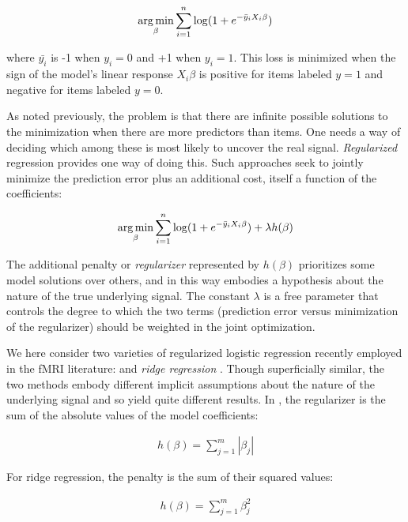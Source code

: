 \begin{align}
\operatorname*{arg\,min}_\beta \sum^{n}_{i=1}{\log(1 + e^{-\bar{y}_i X_i\beta})}
\label{eq.logisticopt}
\end{align}

\noindent where $\bar{y_i}$ is -1 when $y_i=0$ and +1 when $y_i=1$. This loss is minimized when the sign of the model's linear response $X_i\beta$ is positive for items labeled $y=1$ and negative for items labeled $y=0$.

As noted previously, the problem is that there are infinite possible solutions to the minimization when there are more predictors than items. One needs a way of deciding which among these is most likely to uncover the real signal. {\em Regularized} regression provides one way of doing this. Such approaches seek to jointly minimize the prediction error plus an additional cost, itself a function of the coefficients:

\begin{align}
\operatorname*{arg\,min}_\beta \sum^{n}_{i=1}{\log(1 + e^{-\bar{y}_i X_i\beta})} + \lambda h(\beta)
\label{eq.regularized}
\end{align}

The additional penalty or {\em regularizer} represented by $h(\beta)$ prioritizes some model solutions over others, and in this way embodies a hypothesis about the nature of the true underlying signal. The constant $\lambda$ is a free parameter that controls the degree to which the two terms (prediction error versus minimization of the regularizer) should be weighted in the joint optimization.

We here consider two varieties of regularized logistic regression recently employed in the fMRI literature: {\em {\lasso}} \cite{rish_sparse_2012} and {\em ridge regression} \cite{riggall_relationship_2012}. Though superficially similar, the two methods embody different implicit assumptions about the nature of the underlying signal and so yield quite different results. In {\lasso}, the regularizer is the sum of the absolute values of the model coefficients:

\begin{align}
h(\beta) = \sum^m_{j=1} |\beta_j|
\label{eq.lasso}
\end{align}

For ridge regression, the penalty is the sum of their squared values:

\begin{align}
h(\beta) = \sum^m_{j=1}\beta_j^2
\label{eq.ridge}
\end{align}

